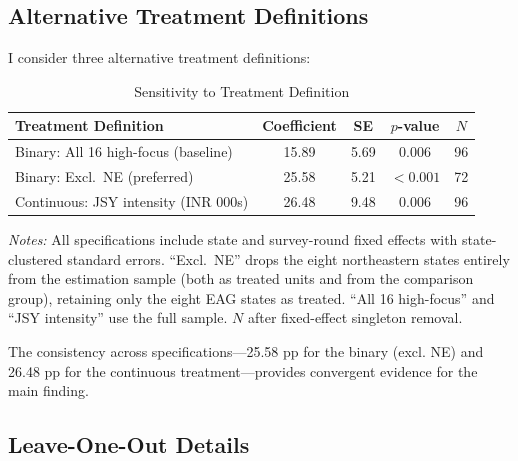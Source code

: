 \documentclass[12pt]{article}
\begin{document}
\subsection{Alternative Treatment Definitions}

I consider three alternative treatment definitions:

\begin{table}[H]
\centering
\caption{Sensitivity to Treatment Definition}
\label{tab:alt_treatment}
\begin{threeparttable}
\begin{tabular}{lcccc}
\toprule
Treatment Definition & Coefficient & SE & $p$-value & $N$ \\
\midrule
Binary: All 16 high-focus (baseline) & 15.89 & 5.69 & 0.006 & 96 \\
Binary: Excl.\ NE (preferred) & 25.58 & 5.21 & $<0.001$ & 72 \\
Continuous: JSY intensity (INR 000s) & 26.48 & 9.48 & 0.006 & 96 \\
\bottomrule
\end{tabular}
\begin{tablenotes}[flushleft]
\small
\item \textit{Notes:} All specifications include state and survey-round fixed effects with state-clustered standard errors. ``Excl.\ NE'' drops the eight northeastern states entirely from the estimation sample (both as treated units and from the comparison group), retaining only the eight EAG states as treated. ``All 16 high-focus'' and ``JSY intensity'' use the full sample. $N$ after fixed-effect singleton removal.
\end{tablenotes}
\end{threeparttable}
\end{table}

The consistency across specifications---25.58 pp for the binary (excl. NE) and 26.48 pp for the continuous treatment---provides convergent evidence for the main finding.

\subsection{Leave-One-Out Details}
\end{document}
